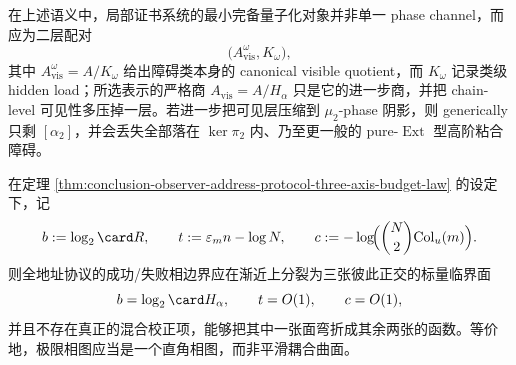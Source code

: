 \begin{conjecture}[局部证书量子化的最小完备对象是二层的]\label{conj:conclusion-observer-minimal-complete-quantization-two-layer}
在上述语义中，局部证书系统的最小完备量子化对象并非单一 phase channel，而应为二层配对
\[
\bigl(A_{\mathrm{vis}}^\omega,K_\omega\bigr),
\]
其中 \(A_{\mathrm{vis}}^\omega=A/K_\omega\) 给出障碍类本身的 canonical visible quotient，而 \(K_\omega\) 记录类级 hidden load；所选表示的严格商 \(A_{\mathrm{vis}}=A/H_\alpha\) 只是它的进一步商，并把 chain-level 可见性多压掉一层。若进一步把可见层压缩到 \(\mu_2\)-phase 阴影，则 generically 只剩 \([\alpha_2]\)，并会丢失全部落在 \(\ker\pi_2\) 内、乃至更一般的 pure-\(\operatorname{Ext}\) 型高阶粘合障碍。
\end{conjecture}

\begin{conjecture}[全地址相图的直角临界面]\label{conj:conclusion-observer-address-phase-diagram-right-angle-frontier}
在定理 \ref{thm:conclusion-observer-address-protocol-three-axis-budget-law} 的设定下，记
\[
b:=\log_2\card R,
\qquad
t:=\varepsilon_m n-\log N,
\qquad
c:=-\log\!\Bigl(\binom{N}{2}\mathrm{Col}_u(m)\Bigr).
\]
则全地址协议的成功/失败相边界应在渐近上分裂为三张彼此正交的标量临界面
\[
b=\log_2\card H_\alpha,
\qquad
t=O(1),
\qquad
c=O(1),
\]
并且不存在真正的混合校正项，能够把其中一张面弯折成其余两张的函数。等价地，极限相图应当是一个直角相图，而非平滑耦合曲面。
\end{conjecture}
